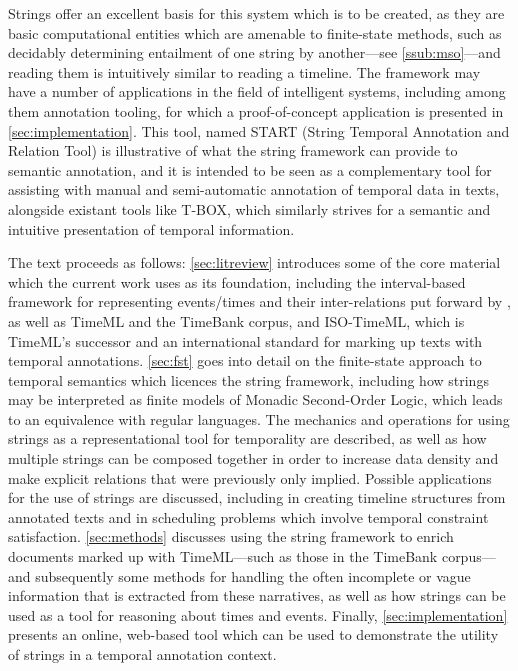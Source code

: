 \documentclass[a4paper,12pt,leqno,twoside]{article}
\begin{document}
Strings offer an excellent basis for this system which is to be created, as they are basic computational entities which are amenable to finite-state methods, such as decidably determining entailment of one string by another---see \cref{ssub:mso}---and reading them is intuitively similar to reading a timeline. The framework may have a number of applications in the field of intelligent systems, including among them annotation tooling, for which a proof-of-concept application is presented in \cref{sec:implementation}. This tool, named START (String Temporal Annotation and Relation Tool) is illustrative of what the string framework can provide to semantic annotation, and it is intended to be seen as a complementary tool for assisting with manual and semi-automatic annotation of temporal data in texts, alongside existant tools like T-BOX, which similarly strives for a semantic and intuitive presentation of temporal information.

The text proceeds as follows: \cref{sec:litreview} introduces some of the core material which the current work uses as its foundation, including the interval-based framework for representing events/times and their inter-relations put forward by \citet{allen1983maintaining}, as well as TimeML and the TimeBank corpus, and ISO-TimeML, which is TimeML's successor and an international standard for marking up texts with temporal annotations. \cref{sec:fst} goes into detail on the finite-state approach to temporal semantics which licences the string framework, including how strings may be interpreted as finite models of Monadic Second-Order Logic, which leads to an equivalence with regular languages. The mechanics and operations for using strings as a representational tool for temporality are described, as well as how multiple strings can be composed together in order to increase data density and make explicit relations that were previously only implied. Possible applications for the use of strings are discussed, including in creating timeline structures from annotated texts and in scheduling problems which involve temporal constraint satisfaction. \cref{sec:methods} discusses using the string framework to enrich documents marked up with TimeML---such as those in the TimeBank corpus---and subsequently some methods for handling the often incomplete or vague information that is extracted from these narratives, as well as how strings can be used as a tool for reasoning about times and events. Finally, \cref{sec:implementation} presents an online, web-based tool which can be used to demonstrate the utility of strings in a temporal annotation context.%
\newpage
\end{document}
